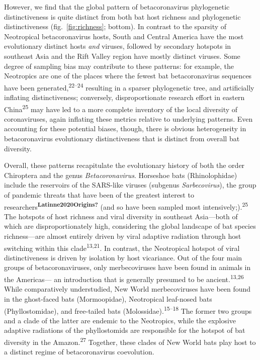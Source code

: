 \documentclass[10pt,oneside]{article}
\begin{document}
However, we find that the global pattern of betacoronavirus phylogenetic
distinctiveness is quite distinct from both bat host richness and
phylogenetic distinctiveness (fig.~\ref{fig:richness}; bottom). In
contrast to the sparsity of Neotropical betacoronavirus hosts, South and
Central America have the most evolutionary distinct hosts \emph{and}
viruses, followed by secondary hotspots in southeast Asia and the Rift
Valley region have mostly distinct viruses. Some degree of sampling bias
may contribute to these patterns: for example, the Neotropics are one of
the places where the fewest bat betacoronavirus sequences have been
generated,\textsuperscript{22--24} resulting in a sparser phylogenetic
tree, and artificially inflating distinctiveness; conversely,
disproportionate research effort in eastern China\textsuperscript{25}
may have led to a more complete inventory of the local diversity of
coronaviruses, again inflating these metrics relative to underlying
patterns. Even accounting for these potential biases, though, there is
obvious heterogeneity in betacoronavirus evolutionary distinctiveness
that is distinct from overall bat diversity.

Overall, these patterns recapitulate the evolutionary history of both
the order Chiroptera and the genus \emph{Betacoronavirus}. Horseshoe
bats (Rhinolophidae) include the reservoirs of the SARS-like viruses
(subgenus \emph{Sarbecovirus}), the group of pandemic threats that have
been of the greatest interest to
researchers\textsuperscript{\textbf{Latinne2020Origins?}} (and so have
been sampled most intensively;).\textsuperscript{25} The hotspots of
host richness and viral diversity in southeast Asia---both of which are
disproportionately high, considering the global landscape of bat species
richness---are almost entirely driven by viral adaptive radiation
through host switching within this clade\textsuperscript{13,21}. In
contrast, the Neotropical hotspot of viral distinctiveness is driven by
isolation by host vicariance. Out of the four main groups of
betacoronaviruses, only merbecoviruses have been found in animals in the
Americas--- an introduction that is generally presumed to be
ancient.\textsuperscript{13,26} While comparatively understudied, New
World merbecoviruses have been found in the ghost-faced bats
(Mormoopidae), Neotropical leaf-nosed bats (Phyllostomidae), and
free-tailed bats (Molossidae).\textsuperscript{15--18} The former two
groups and a clade of the latter are endemic to the Neotropics, while
the explosive adaptive radiations of the phyllostomids are responsible
for the hotspot of bat diversity in the Amazon.\textsuperscript{27}
Together, these clades of New World bats play host to a distinct regime
of betacoronavirus coevolution.
\end{document}
